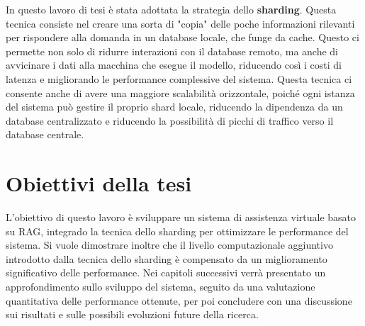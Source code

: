 In questo lavoro di tesi è stata adottata la strategia dello \textbf{sharding}. Questa tecnica consiste nel creare una sorta di "copia" delle poche informazioni rilevanti per rispondere alla domanda in un database locale, che funge da cache. Questo ci permette non solo di ridurre interazioni con il database remoto, ma anche di avvicinare i dati alla macchina che esegue il modello, riducendo così i costi di latenza e migliorando le performance complessive del sistema. Questa tecnica ci consente anche di avere una maggiore scalabilità orizzontale, poiché ogni istanza del sistema può gestire il proprio shard locale, riducendo la dipendenza da un database centralizzato e riducendo la possibilità di picchi di traffico verso il database centrale.

\section*{Obiettivi della tesi}

L'obiettivo di questo lavoro è sviluppare un sistema di assistenza virtuale basato su RAG, integrado la tecnica dello sharding per ottimizzare le performance del sistema. Si vuole dimostrare inoltre che il livello computazionale aggiuntivo introdotto dalla tecnica dello sharding è compensato da un miglioramento significativo delle performance. Nei capitoli successivi verrà presentato un approfondimento sullo sviluppo del sistema, seguito da una valutazione quantitativa delle performance ottenute, per poi concludere con una discussione sui risultati e sulle possibili evoluzioni future della ricerca.